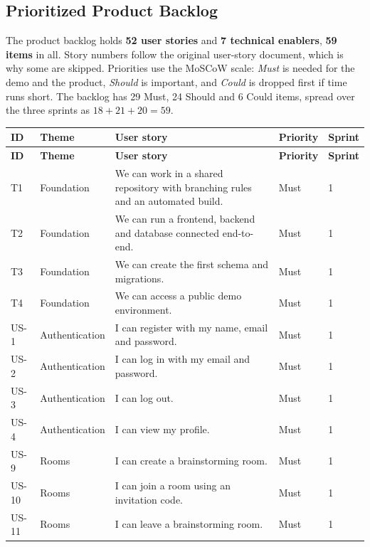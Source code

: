 \documentclass[12pt,a4paper]{report}
\begin{document}
\subsection{Prioritized Product Backlog}
\label{subsec:backlog}

The product backlog holds \textbf{52 user stories} and \textbf{7 technical enablers}, \textbf{59 items} in all. Story numbers follow the original user-story document, which is why some are skipped. Priorities use the MoSCoW scale: \textit{Must} is needed for the demo and the product, \textit{Should} is important, and \textit{Could} is dropped first if time runs short. The backlog has 29 Must, 24 Should and 6 Could items, spread over the three sprints as $18+21+20=59$.

\begin{longtable}{@{}p{}p{}p{}p{}p{}@{}}
\toprule
\textbf{ID} & \textbf{Theme} & \textbf{User story} & \textbf{Priority} & \textbf{Sprint} \\
\midrule
\endfirsthead
\toprule
\textbf{ID} & \textbf{Theme} & \textbf{User story} & \textbf{Priority} & \textbf{Sprint} \\
\midrule
\endhead
\bottomrule
\endfoot
T1 & Foundation & We can work in a shared repository with branching rules and an automated build. & Must & 1 \\
T2 & Foundation & We can run a frontend, backend and database connected end-to-end. & Must & 1 \\
T3 & Foundation & We can create the first schema and migrations. & Must & 1 \\
T4 & Foundation & We can access a public demo environment. & Must & 1 \\
US-1 & Authentication & I can register with my name, email and password. & Must & 1 \\
US-2 & Authentication & I can log in with my email and password. & Must & 1 \\
US-3 & Authentication & I can log out. & Must & 1 \\
US-4 & Authentication & I can view my profile. & Must & 1 \\
US-9 & Rooms & I can create a brainstorming room. & Must & 1 \\
US-10 & Rooms & I can join a room using an invitation code. & Must & 1 \\
US-11 & Rooms & I can leave a brainstorming room. & Must & 1 \\

\end{longtable}
\end{document}
